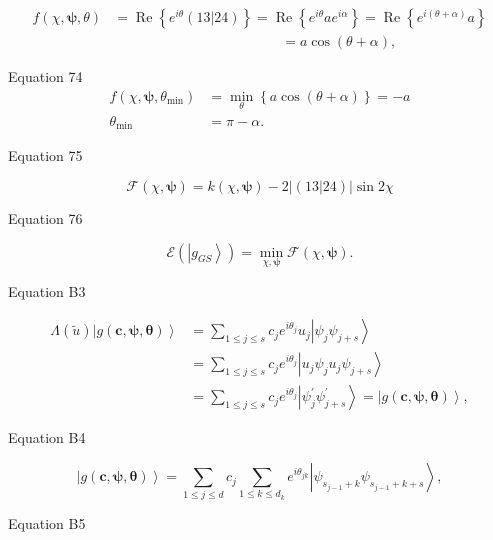 \documentclass[aps]{revtex4}%
\begin{document}
\begin{align*}
f\left(  \chi,\boldsymbol{\psi},\theta\right)   &  =\operatorname{Re}\left\{
e^{i\theta}\left(  \left.  13\right\vert 24\right)  \right\}
=\operatorname{Re}\left\{  e^{i\theta}ae^{i\alpha}\right\}  =\operatorname{Re}%
\left\{  e^{i\left(  \theta+\alpha\right)  }a\right\} \\
&  \qquad\qquad\qquad\qquad\qquad\qquad=a\cos\left(  \theta+\alpha\right)  ,
\end{align*}


Equation 74%
\begin{align*}
f\left(  \chi,\boldsymbol{\psi},\theta_{\min}\right)   &  =\min_{\theta
}\left\{  a\cos\left(  \theta+\alpha\right)  \right\}  =-a\\
\theta_{\min}  &  =\pi-\alpha.
\end{align*}


Equation 75%

\[
\mathcal{F}\left(  \chi,\boldsymbol{\psi}\right)  =k\left(  \chi
,\boldsymbol{\psi}\right)  -2\left\vert \left(  \left.  13\right\vert
24\right)  \right\vert \sin2\chi
\]


Equation 76%

\[
\mathcal{E}\left(  \left\vert g_{GS}\right\rangle \right)  =\min
_{\chi,\boldsymbol{\psi}}\mathcal{F}\left(  \chi,\boldsymbol{\psi}\right)  .
\]


Equation B3%

\begin{align*}
\Lambda\left(  \tilde{u}\right)  \left\vert g\left(  \boldsymbol{c}%
,\boldsymbol{\psi},\boldsymbol{\theta}\right)  \right\rangle  &  =\sum_{1\leq
j\leq s}c_{j}e^{i\theta_{j}}u_{j}\left\vert \psi_{j}\psi_{j+s}\right\rangle \\
&  =\sum_{1\leq j\leq s}c_{j}e^{i\theta_{j}}\left\vert u_{j}\psi_{j}u_{j}%
\psi_{j+s}\right\rangle \\
&  =\sum_{1\leq j\leq s}c_{j}e^{i\theta_{j}}\left\vert \psi_{j}^{\prime}%
\psi_{j+s}^{\prime}\right\rangle =\left\vert g\left(  \boldsymbol{c}%
,\boldsymbol{\psi},\boldsymbol{\theta}\right)  \right\rangle ,
\end{align*}


Equation B4%

\[
\left\vert g\left(  \boldsymbol{c},\boldsymbol{\psi},\boldsymbol{\theta
}\right)  \right\rangle =\sum_{1\leq j\leq d}c_{j}\sum_{1\leq k\leq d_{k}%
}e^{i\theta_{jk}}\left\vert \psi_{s_{j-1}+k}\psi_{s_{j-1}+k+s}\right\rangle ,
\]


Equation B5%
\end{document}
